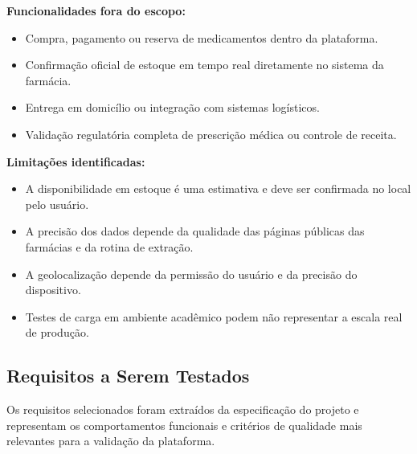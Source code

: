 \textbf{Funcionalidades fora do escopo:}
\begin{itemize}
    \item Compra, pagamento ou reserva de medicamentos dentro da plataforma.
    \item Confirmação oficial de estoque em tempo real diretamente no sistema da farmácia.
    \item Entrega em domicílio ou integração com sistemas logísticos.
    \item Validação regulatória completa de prescrição médica ou controle de receita.
\end{itemize}

\textbf{Limitações identificadas:}
\begin{itemize}
    \item A disponibilidade em estoque é uma estimativa e deve ser confirmada no local pelo usuário.
    \item A precisão dos dados depende da qualidade das páginas públicas das farmácias e da rotina de extração.
    \item A geolocalização depende da permissão do usuário e da precisão do dispositivo.
    \item Testes de carga em ambiente acadêmico podem não representar a escala real de produção.
\end{itemize}

\subsection{Requisitos a Serem Testados} %

Os requisitos selecionados foram extraídos da especificação do projeto e representam os comportamentos funcionais e critérios de qualidade mais relevantes para a validação da plataforma.

